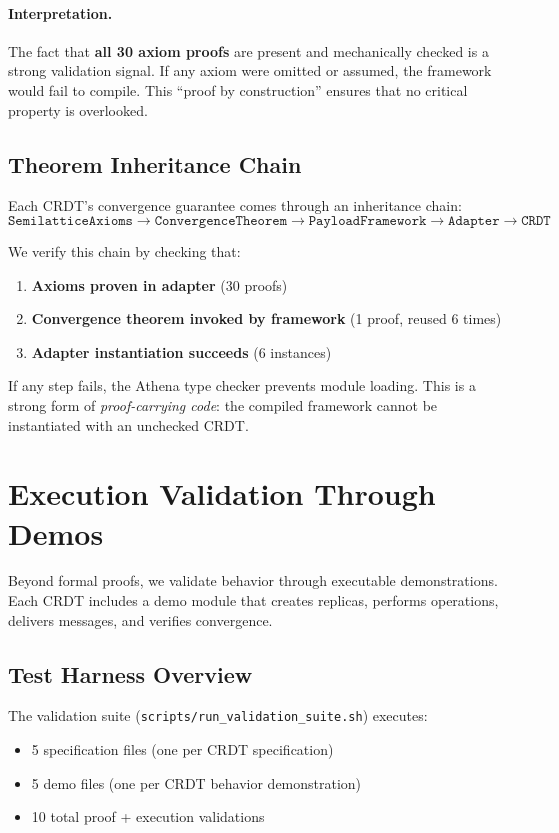 \paragraph{Interpretation.}
The fact that \textbf{all 30 axiom proofs} are present and mechanically checked is a strong validation signal. If any axiom were omitted or assumed, the framework would fail to compile. This ``proof by construction'' ensures that no critical property is overlooked.

\subsection{Theorem Inheritance Chain}

Each CRDT's convergence guarantee comes through an inheritance chain:
\[
\texttt{SemilatticeAxioms} \rightarrow \texttt{ConvergenceTheorem} \rightarrow \texttt{PayloadFramework} \rightarrow \texttt{Adapter} \rightarrow \texttt{CRDT}
\]

We verify this chain by checking that:
\begin{enumerate}
  \item \textbf{Axioms proven in adapter} (30 proofs)
  \item \textbf{Convergence theorem invoked by framework} (1 proof, reused 6 times)
  \item \textbf{Adapter instantiation succeeds} (6 instances)
\end{enumerate}

If any step fails, the Athena type checker prevents module loading. This is a strong form of \emph{proof-carrying code}: the compiled framework cannot be instantiated with an unchecked CRDT.

\section{Execution Validation Through Demos}

Beyond formal proofs, we validate behavior through executable demonstrations. Each CRDT includes a demo module that creates replicas, performs operations, delivers messages, and verifies convergence.

\subsection{Test Harness Overview}

The validation suite (\texttt{scripts/run\_validation\_suite.sh}) executes:
\begin{itemize}
  \item 5 specification files (one per CRDT specification)
  \item 5 demo files (one per CRDT behavior demonstration)
  \item 10 total proof + execution validations
\end{itemize}

